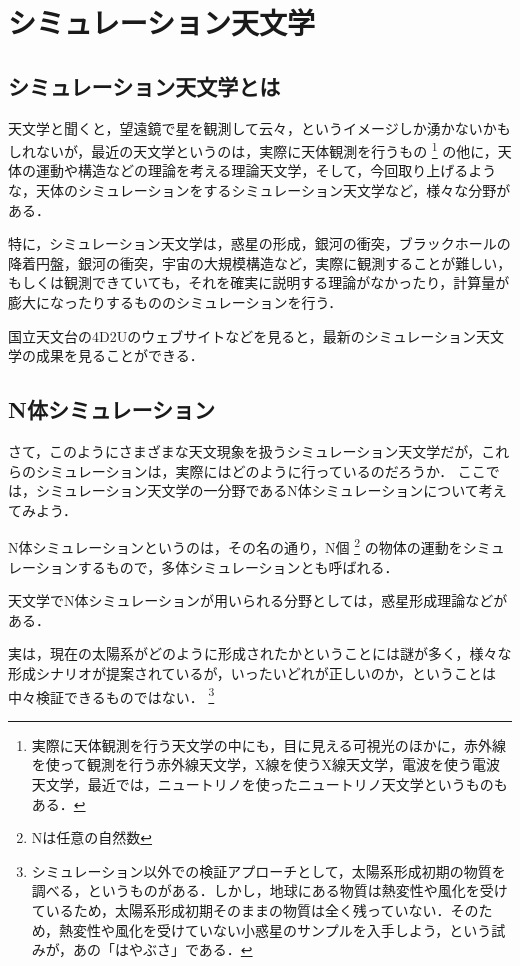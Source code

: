 \chapter{シミュレーション天文学}

\section{シミュレーション天文学とは}
天文学と聞くと，望遠鏡で星を観測して云々，というイメージしか湧かないかもしれないが，最近の天文学というのは，実際に天体観測を行うもの
\footnote{実際に天体観測を行う天文学の中にも，目に見える可視光のほかに，赤外線を使って観測を行う赤外線天文学，X線を使うX線天文学，電波を使う電波天文学，最近では，ニュートリノを使ったニュートリノ天文学というものもある．}
の他に，天体の運動や構造などの理論を考える理論天文学，そして，今回取り上げるような，天体のシミュレーションをするシミュレーション天文学など，様々な分野がある．


特に，シミュレーション天文学は，惑星の形成，銀河の衝突，ブラックホールの降着円盤，銀河の衝突，宇宙の大規模構造など，実際に観測することが難しい，もしくは観測できていても，それを確実に説明する理論がなかったり，計算量が膨大になったりするもののシミュレーションを行う．

国立天文台の4D2Uのウェブサイトなどを見ると，最新のシミュレーション天文学の成果を見ることができる．

\section{N体シミュレーション}
さて，このようにさまざまな天文現象を扱うシミュレーション天文学だが，これらのシミュレーションは，実際にはどのように行っているのだろうか．
ここでは，シミュレーション天文学の一分野であるN体シミュレーションについて考えてみよう．


N体シミュレーションというのは，その名の通り，N個
\footnote{Nは任意の自然数}
の物体の運動をシミュレーションするもので，多体シミュレーションとも呼ばれる．


天文学でN体シミュレーションが用いられる分野としては，惑星形成理論などがある．

実は，現在の太陽系がどのように形成されたかということには謎が多く，様々な形成シナリオが提案されているが，いったいどれが正しいのか，ということは中々検証できるものではない．
\footnote{シミュレーション以外での検証アプローチとして，太陽系形成初期の物質を調べる，というものがある．しかし，地球にある物質は熱変性や風化を受けているため，太陽系形成初期そのままの物質は全く残っていない．そのため，熱変性や風化を受けていない小惑星のサンプルを入手しよう，という試みが，あの「はやぶさ」である．}

